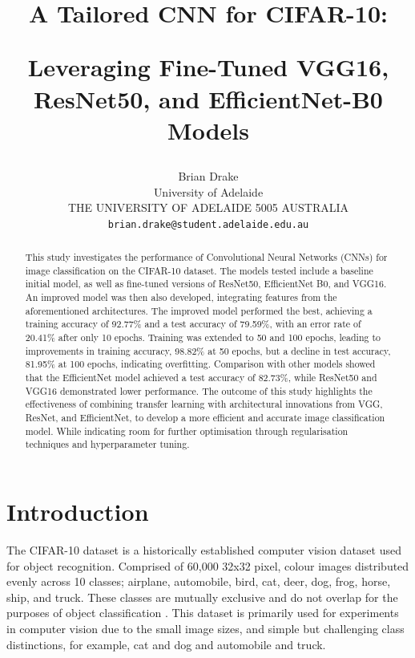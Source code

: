 \documentclass[10pt,twocolumn,letterpaper]{article}
\begin{document}
\title{A Tailored CNN for CIFAR-10: 

Leveraging Fine-Tuned VGG16, ResNet50, and EfficientNet-B0 Models}

\author{Brian Drake\\
University of Adelaide\\
THE UNIVERSITY OF ADELAIDE
5005 AUSTRALIA\\
{\tt\small brian.drake@student.adelaide.edu.au}
}
\maketitle

\begin{abstract}
This study investigates the performance of Convolutional Neural Networks (CNNs) for image classification on the CIFAR-10 dataset. The models tested include a baseline initial model, as well as fine-tuned versions of ResNet50, EfficientNet B0, and VGG16. An improved model was then also developed, integrating features from the aforementioned architectures. The improved model performed the best, achieving a training accuracy of 92.77\% and a test accuracy of 79.59\%, with an error rate of 20.41\% after only 10 epochs. Training was extended to 50 and 100 epochs, leading to improvements in training accuracy, 98.82\% at 50 epochs, but a decline in test accuracy, 81.95\% at 100 epochs, indicating overfitting. Comparison with other models showed that the EfficientNet model achieved a test accuracy of 82.73\%, while ResNet50 and VGG16 demonstrated lower performance. The outcome of this study highlights the effectiveness of combining transfer learning with architectural innovations from VGG, ResNet, and EfficientNet, to develop a more efficient and accurate image classification model. While indicating room for further optimisation through regularisation techniques and hyperparameter tuning.
\end{abstract}

\section{Introduction}
\label{sec:intro}
The CIFAR-10 dataset is a historically established computer vision dataset used for object recognition. Comprised of 60,000 32x32 pixel, colour images distributed evenly across 10 classes; airplane, automobile, bird, cat, deer, dog, frog, horse, ship, and truck. These classes are mutually exclusive and do not overlap for the purposes of object classification \cite{cifar10}. This dataset is primarily used for experiments in computer vision due to the small image sizes, and simple but challenging class distinctions, for example, cat and dog and automobile and truck.
\end{document}
